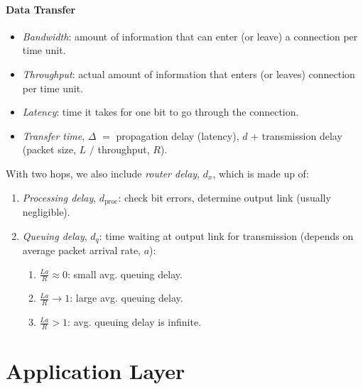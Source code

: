 \documentclass[twocolumn,english]{article}
\begin{document}
\paragraph{Data Transfer}
\begin{itemize}
\item \emph{Bandwidth}: amount of information that can enter (or leave)
a connection per time unit.
\item \emph{Throughput}: actual amount of information that enters (or leaves)
connection per time unit.
\item \emph{Latency}: time it takes for one bit to go through the connection.
\item \emph{Transfer time}, $\Delta$ $=$ propagation delay (latency),
$d$ $+$ transmission delay (packet size, $L$ $/$ throughput, $R$).
\end{itemize}
With two hops, we also include \emph{router delay}, $d_{x}$, which
is made up of:
\begin{enumerate}
\item \emph{Processing delay}, $d_{\text{proc}}$: check bit errors, determine
output link (usually negligible).
\item \emph{Queuing delay}, $d_{q}$: time waiting at output link for transmission
(depends on average packet arrival rate, $a$):
\begin{enumerate}
\item $\frac{La}{R}\approx0$: small avg. queuing delay.
\item $\frac{La}{R}\rightarrow1$: large avg. queuing delay.
\item $\frac{La}{R}>1$: avg. queuing delay is infinite.
\end{enumerate}
\end{enumerate}

\section{Application Layer}
\end{document}
